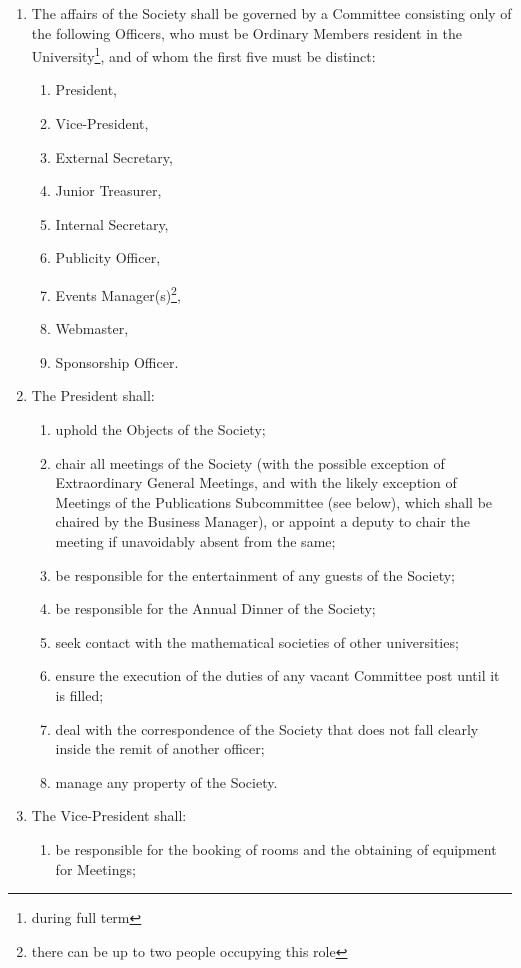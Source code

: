 \documentclass{article}
\begin{document}
\begin{enumerate}
\item The affairs of the Society shall be governed by a Committee consisting
only of the following Officers, who must be Ordinary Members resident in
the University\footnote{during full term}, and of whom the first five must be distinct:
  \begin{enumerate}
  \item President,
  \item Vice-President,
  \item External Secretary,
  \item Junior Treasurer,
  \item Internal Secretary,
  \item Publicity Officer,
  \item Events Manager(s)\footnote{there can be up to two people occupying this role},
  \item Webmaster,
  \item Sponsorship Officer.
  \end{enumerate}
\item The President shall:
  \begin{enumerate}
  \item uphold the Objects of the Society;
  \item chair all meetings of the Society (with the possible exception of Extraordinary General Meetings, and with the likely exception of Meetings of the Publications Subcommittee (see below), which shall be
  chaired by the Business Manager), or appoint a deputy to chair the
  meeting if unavoidably absent from the same;
  \item be responsible for the entertainment of any guests of the Society;
  \item be responsible for the Annual Dinner of the Society;
  \item seek contact with the mathematical societies of other universities;
  \item ensure the execution of the duties of any vacant Committee post until
  it is filled;
  \item deal with the correspondence of the Society that does not fall clearly inside the remit of another officer;
  \item manage any property of the Society.
  \end{enumerate}
\item The Vice-President shall:
  \begin{enumerate}
  \item be responsible for the booking of rooms and the obtaining of equipment for Meetings;

\end{enumerate}
\end{enumerate}
\end{document}

